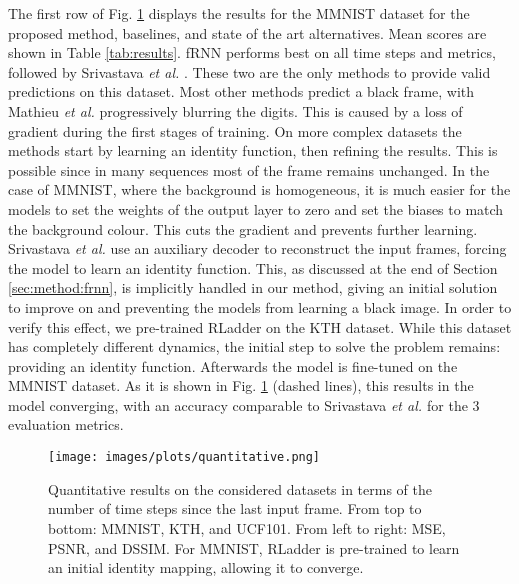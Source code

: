 \documentclass[runningheads]{llncs}
\begin{document}
The first row of Fig. \ref{fig:quantitative} displays the results for the MMNIST dataset for the proposed method, baselines, and state of the art alternatives. Mean scores are shown in Table \ref{tab:results}. fRNN performs best on all time steps and metrics, followed by Srivastava \emph{et al.} \cite{srivastava2015unsupervised}. These two are the only methods to provide valid predictions on this dataset. Most other methods predict a black frame, with Mathieu \emph{et al.} \cite{mathieu2015deep} progressively blurring the digits. This is caused by a loss of gradient during the first stages of training. On more complex datasets the methods start by learning an identity function, then refining the results. This is possible since in many sequences most of the frame remains unchanged. In the case of MMNIST, where the background is homogeneous, it is much easier for the models to set the weights of the output layer to zero and set the biases to match the background colour. This cuts the gradient and prevents further learning. Srivastava \emph{et al.} \cite{srivastava2015unsupervised} use an auxiliary decoder to reconstruct the input frames, forcing the model to learn an identity function. This, as discussed at the end of Section \ref{sec:method:frnn}, is implicitly handled in our method, giving an initial solution to improve on and preventing the models from learning a black image. In order to verify this effect, we pre-trained RLadder on the KTH dataset. While this dataset has completely different dynamics, the initial step to solve the problem remains: providing an identity function. Afterwards the model is fine-tuned on the MMNIST dataset. As it is shown in Fig. \ref{fig:quantitative} (dashed lines), this results in the model converging, with an accuracy comparable to Srivastava \emph{et al. \cite{srivastava2015unsupervised}} for the 3 evaluation metrics.

\begin{figure}[t!]
    \centering
    \vspace{2mm}
    \texttt{[image: images/plots/quantitative.png]}
    \vspace{-8mm}
    \caption{Quantitative results on the considered datasets in terms of the number of time steps since the last input frame. From top to bottom: MMNIST, KTH, and UCF101. From left to right: MSE, PSNR, and DSSIM. For MMNIST, RLadder is pre-trained to learn an initial identity mapping, allowing it to converge.}
    \label{fig:quantitative}
\end{figure}
\end{document}
